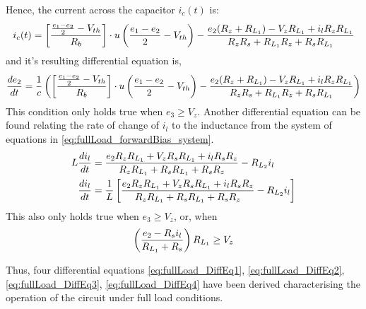Hence, the current across the capacitor $i_c(t)$ is:
\begin{equation}
	i_c(t) = \left[\frac{\frac{e_1 - e_2}{2} - V_{th}}{R_b} \right]\cdot u\left(\frac{e_1 - e_2}{2} - V_{th} \right) - \frac{e_2 (R_z + R_{L_1}) - V_z R_{L_1} + i_l R_z R_{L_1}}{R_z R_s + R_{L_1} R_z + R_s R_{L_1}}
\end{equation}
and it's resulting differential equation is,
\begin{equation}
	\frac{de_2}{dt} = \frac{1}{c}\left(\left[\frac{\frac{e_1 - e_2}{2} - V_{th}}{R_b} \right]\cdot u\left(\frac{e_1 - e_2}{2} - V_{th} \right) - \frac{e_2 (R_z + R_{L_1}) - V_z R_{L_1} + i_l R_z R_{L_1}}{R_z R_s + R_{L_1} R_z + R_s R_{L_1}} \right)
	\label{eq:fullLoad_DiffEq3}
\end{equation}
This condition only holds true when $e_3 \geq V_z$. Another differential equation can be found relating the rate of change of $i_l$ to the inductance from the system of equations in \eqref{eq:fullLoad_forwardBias_system}.
\begin{equation}
	\begin{split}
		L\frac{di_l}{dt} &= \frac{e_2 R_z R_{L_1} + V_z R_s R_{L_1} + i_l R_s R_z}{R_z R_{L_1} + R_s R_{L_1} + R_s R_z} - R_{L_2}i_l \\
		 \frac{di_l}{dt} &= \frac{1}{L} \left[\frac{e_2 R_z R_{L_1} + V_z R_s R_{L_1} + i_l R_s R_z}{R_z R_{L_1} + R_s R_{L_1} + R_s R_z} - R_{L_2}i_l \right]
	\end{split}
	\label{eq:fullLoad_DiffEq4}
\end{equation}
This also only holds true when $e_3 \geq V_z$, or, when
\begin{equation}
	\left(\frac{e_2 - R_s i_l}{R_{L_1} + R_s} \right)R_{L_1} \geq V_z
\end{equation}

Thus, four differential equations \eqref{eq:fullLoad_DiffEq1}, \eqref{eq:fullLoad_DiffEq2}, \eqref{eq:fullLoad_DiffEq3}, \eqref{eq:fullLoad_DiffEq4} have been derived characterising the operation of the circuit under full load conditions.

